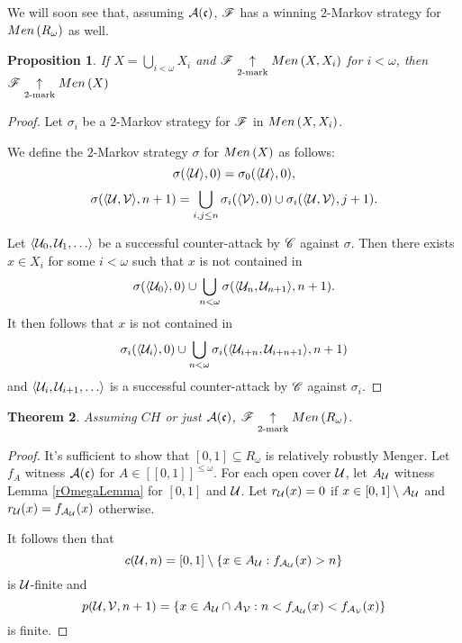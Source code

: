 \documentclass{amsart}
\newtheorem{theorem}{Theorem}[section]
\newtheorem{proposition}[theorem]{Proposition}
\theoremstyle{definition}
\begin{document}
We will soon see that, assuming \(\mathcal{A}(\mathfrak{c})\), \(\mathscr{F}\) has a winning
\(2\)-Markov strategy for \(Men\left({R_\omega}\right)\) as well.

\begin{proposition}
  If \(X=\bigcup_{i<\omega} X_i\) and \(\mathscr{F} \underset{2\text{-mark}}{\uparrow} Men\left({X,X_i}\right)\)
  for \(i<\omega\), then \(\mathscr{F} \underset{2\text{-mark}}{\uparrow} Men\left({X}\right)\)
\end{proposition}

\begin{proof}
  Let \(\sigma_i\) be a \(2\)-Markov strategy
  for \(\mathscr{F}\) in \(Men\left({X,X_i}\right)\).

  We define the \(2\)-Markov strategy
  \(\sigma\) for \(Men\left({X}\right)\) as follows:
    \[
      \sigma(\langle\mathcal{U}\rangle,0) = \sigma_0(\langle\mathcal{U}\rangle,0)
    ,\]
    \[
      \sigma(\langle\mathcal{U},\mathcal{V}\rangle,n+1)
        =
      \bigcup_{i,j\leq n}
      \sigma_i(\langle\mathcal{V}\rangle,0)
        \cup
      \sigma_i(\langle\mathcal{U},\mathcal{V}\rangle,j+1)
    .\]

  Let \(\<\mc U_0,\mc U_1,\dots\>\) be a successful counter-attack by \(\mathscr{C}\)
  against \(\sigma\). Then there exists \(x\in X_i\) for
  some \(i<\omega\) such that \(x\) is not contained in
  \[
    \sigma(\langle\mathcal{U}_0\rangle,0)
      \cup
    \bigcup_{n<\omega}
    \sigma(\langle\mathcal{U}_n,\mathcal{U}_{n+1}\rangle,n+1)
  .\]
  It then follows that \(x\) is not contained in
  \[
    \sigma_i(\langle\mathcal{U}_i\rangle,0)
      \cup
    \bigcup_{n<\omega}
    \sigma_i(\langle\mathcal{U}_{i+n},\mathcal{U}_{i+n+1}\rangle,n+1)
  \]
  and \(\<\mc U_i,\mc U_{i+1},\dots\>\) is a successful counter-attack
  by \(\mathscr{C}\) against \(\sigma_i\).
\end{proof}

\begin{theorem}
  Assuming \(CH\) or just \(\mathcal{A}(\mathfrak{c})\),
  \(\mathscr{F}\underset{2\text{-mark}}{\uparrow}Men\left({R_\omega}\right)\).
\end{theorem}

\begin{proof}
  It's sufficient to show that \([0,1]\subseteq R_\omega\) is relatively
  robustly Menger. Let \(f_A\) witness \(\mathcal{A}(\mathfrak{c})\)
  for \(A\in[[0,1]]^{\leq\omega}\).
  For each open cover \(\mathcal{U}\), let \(A_{\mathcal{U}}\) witness Lemma
  \ref{rOmegaLemma} for \([0,1]\) and \(\mathcal{U}\).
  Let \(r_{\mathcal{U}}(x)=0\) if \(x\in[0,1]\setminus A_{\mathcal{U}}\) and
  \(r_{\mathcal{U}}(x)=f_{\mathcal{A}_{\mathcal{U}}}(x)\) otherwise.

  It follows then that
    \[
      c(\mathcal{U},n) = [0,1]\setminus\{x\in A_{\mathcal{U}}:f_{\mathcal{A}_{\mathcal{U}}}(x)>n\}
    \]
  is \(\mathcal{U}\)-finite and
    \[
      p(\mathcal{U},\mathcal{V},n+1)
        =
      \{x\in A_{\mathcal{U}}\cap A_{\mathcal{V}}
        :
      n<f_{\mathcal{A}_{\mathcal{U}}}(x)<f_{\mathcal{A}_{\mathcal{V}}}(x)\}
    \]
  is finite.
\end{proof}
\end{document}
